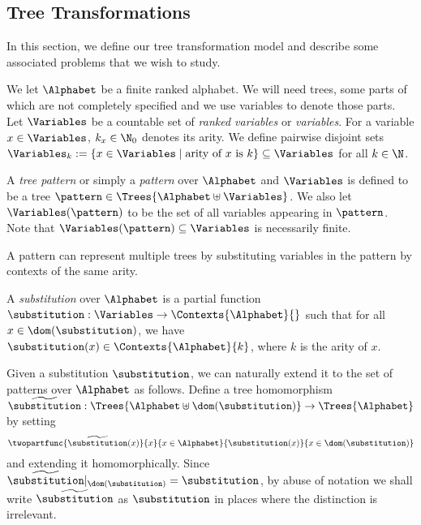\subsection{Tree Transformations}\label{subsec:model}

In this section, we define our tree transformation model and describe some associated problems that we wish to study. 

We let $\Alphabet$ be a finite ranked alphabet.
We will need trees, some parts of which are not completely specified
and we use variables to denote those parts. Let $\Variables$ be a
countable set of
\emph{ranked variables} or \emph{variables}. For a variable $x \in
\Variables$, $k_x \in \N_0$ denotes its arity. We define
pairwise disjoint sets $\Variables_k := \{x \in \Variables \mid
\mbox{arity of $x$ is $k$}\} \subseteq \Variables$ for all $k \in \N$.

\begin{definition}[Pattern]\label{def:pattern}
  A \emph{tree pattern} or simply a \emph{pattern} over $\Alphabet$
  and $\Variables$ is defined to be a tree $\pattern \in
  \Trees{\Alphabet \uplus \Variables}$. We also let
  \emph{$\Variables(\pattern)$} to be the set of all variables appearing
  in $\pattern$. Note that $\Variables(\pattern) \subseteq \Variables$ is
  necessarily finite.
\end{definition}

A pattern can represent multiple trees by substituting variables  in the pattern by  contexts of the same arity.
\begin{definition}[Substitution]\label{def:substitution}
  A \emph{substitution} over $\Alphabet$ is a partial function
  $\substitution : \Variables \to \Contexts{\Alphabet}{}$ such that
  for all $x \in \dom(\substitution)$, we have $\substitution(x)
  \in \Contexts{\Alphabet}{k}$, where $k$ is the arity of $x$.
\end{definition}

Given a substitution $\substitution$, we can naturally extend it to the set of patterns over $\Alphabet$ as follows. Define a tree homomorphism $\widetilde{\substitution} : \Trees{\Alphabet \uplus \dom(\substitution)} \to \Trees{\Alphabet}$ by setting
\[\twopartfunc{\widetilde{\substitution}(x)}{x}{x \in \Alphabet}{\substitution(x)}{x \in \dom(\substitution)}\]
and extending it homomorphically. Since
$\widetilde{\substitution}|_{\dom(\substitution)} = \substitution$, by
abuse of notation we shall write $\widetilde{\substitution}$ as
$\substitution$ in places where the distinction is irrelevant.

